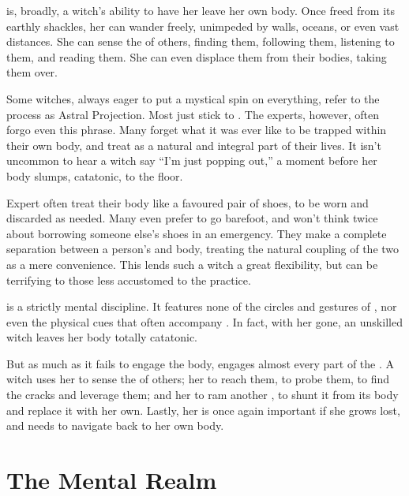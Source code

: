 
 is, broadly, a witch's ability to have her {\mind} leave her own body.
Once freed from its earthly shackles, her {\mind} can wander freely, unimpeded by walls, oceans, or even vast distances.
She can sense the {\minds} of others, finding them, following them, listening to them, and reading them.
She can even displace them from their bodies, taking them over.

Some witches, always eager to put a mystical spin on everything, refer to the process as Astral Projection.
Most just stick to .
The experts, however, often forgo even this phrase.
Many forget what it was ever like to be trapped within their own body, and treat  as a natural and integral part of their lives.
It isn't uncommon to hear a witch say ``I'm just popping out,'' a moment before her body slumps, catatonic, to the floor.

Expert  often treat their body like a favoured pair of shoes, to be worn and discarded as needed.
Many even prefer to go barefoot, and won't think twice about borrowing someone else's shoes in an emergency.
They make a complete separation between a person's {\mind} and body, treating the natural coupling of the two as a mere convenience.
This lends such a witch a great flexibility, but can be terrifying to those less accustomed to the practice.

 is a strictly mental discipline.
It features none of the circles and gestures of , nor even the physical cues that often accompany .
In fact, with her {\mind} gone, an unskilled witch leaves her body totally catatonic.

But as much as it fails to engage the body,  engages almost every part of the {\mind}.
A witch uses her  to sense the {\minds} of others; her  to reach them, to probe them, to find the cracks and leverage them; and her  to ram another {\mind}, to shunt it from its body and replace it with her own.
Lastly, her  is once again important if she grows lost, and needs to navigate back to her own body.

\section{The Mental Realm}

